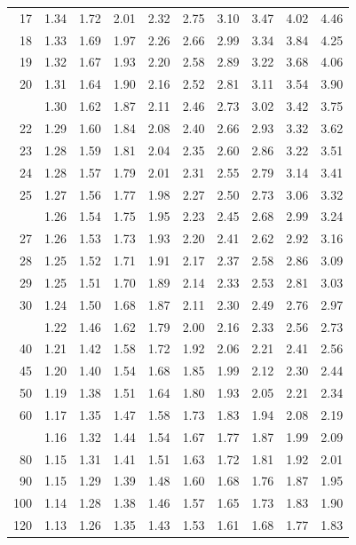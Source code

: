 \documentclass[10pt]{article}
\begin{document}
\begin{longtable}{@{}r!{\vrule width 0.8pt\hspace{0.55em}}rrrrrrrrr@{}}
17 & 1.34 & 1.72 & 2.01 & 2.32 & 2.75 & 3.10 & 3.47 & 4.02 & 4.46 \\
18 & 1.33 & 1.69 & 1.97 & 2.26 & 2.66 & 2.99 & 3.34 & 3.84 & 4.25 \\
19 & 1.32 & 1.67 & 1.93 & 2.20 & 2.58 & 2.89 & 3.22 & 3.68 & 4.06 \\
20 & 1.31 & 1.64 & 1.90 & 2.16 & 2.52 & 2.81 & 3.11 & 3.54 & 3.90 \\
 & 1.30 & 1.62 & 1.87 & 2.11 & 2.46 & 2.73 & 3.02 & 3.42 & 3.75 \\
22 & 1.29 & 1.60 & 1.84 & 2.08 & 2.40 & 2.66 & 2.93 & 3.32 & 3.62 \\
23 & 1.28 & 1.59 & 1.81 & 2.04 & 2.35 & 2.60 & 2.86 & 3.22 & 3.51 \\
24 & 1.28 & 1.57 & 1.79 & 2.01 & 2.31 & 2.55 & 2.79 & 3.14 & 3.41 \\
25 & 1.27 & 1.56 & 1.77 & 1.98 & 2.27 & 2.50 & 2.73 & 3.06 & 3.32 \\
 & 1.26 & 1.54 & 1.75 & 1.95 & 2.23 & 2.45 & 2.68 & 2.99 & 3.24 \\
27 & 1.26 & 1.53 & 1.73 & 1.93 & 2.20 & 2.41 & 2.62 & 2.92 & 3.16 \\
28 & 1.25 & 1.52 & 1.71 & 1.91 & 2.17 & 2.37 & 2.58 & 2.86 & 3.09 \\
29 & 1.25 & 1.51 & 1.70 & 1.89 & 2.14 & 2.33 & 2.53 & 2.81 & 3.03 \\
30 & 1.24 & 1.50 & 1.68 & 1.87 & 2.11 & 2.30 & 2.49 & 2.76 & 2.97 \\
 & 1.22 & 1.46 & 1.62 & 1.79 & 2.00 & 2.16 & 2.33 & 2.56 & 2.73 \\
40 & 1.21 & 1.42 & 1.58 & 1.72 & 1.92 & 2.06 & 2.21 & 2.41 & 2.56 \\
45 & 1.20 & 1.40 & 1.54 & 1.68 & 1.85 & 1.99 & 2.12 & 2.30 & 2.44 \\
50 & 1.19 & 1.38 & 1.51 & 1.64 & 1.80 & 1.93 & 2.05 & 2.21 & 2.34 \\
60 & 1.17 & 1.35 & 1.47 & 1.58 & 1.73 & 1.83 & 1.94 & 2.08 & 2.19 \\
 & 1.16 & 1.32 & 1.44 & 1.54 & 1.67 & 1.77 & 1.87 & 1.99 & 2.09 \\
80 & 1.15 & 1.31 & 1.41 & 1.51 & 1.63 & 1.72 & 1.81 & 1.92 & 2.01 \\
90 & 1.15 & 1.29 & 1.39 & 1.48 & 1.60 & 1.68 & 1.76 & 1.87 & 1.95 \\
100 & 1.14 & 1.28 & 1.38 & 1.46 & 1.57 & 1.65 & 1.73 & 1.83 & 1.90 \\
120 & 1.13 & 1.26 & 1.35 & 1.43 & 1.53 & 1.61 & 1.68 & 1.77 & 1.83 \\

\end{longtable}
\end{document}
